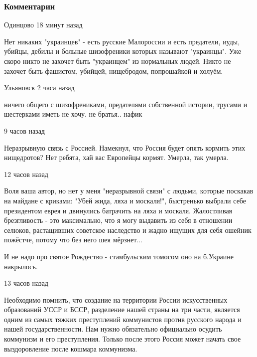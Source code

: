  
 
 
 
 
\subsubsection{Комментарии}
\label{sec:28_12_2020.news.ru.vz.storozhenko_nikolai.1.russia_ukraina_svjaz.comments}

\begin{itemize}

 Одинцово 18 минут назад  

Нет никаких "украинцев" - есть русские Малороссии и есть предатели, иуды,
убийцы, дебилы и больные шизофреники которых называют "украинцы". Уже скоро
никто не захочет быть "украинцем" из нормальных людей. Никто не захочет быть
фашистом, убийцей, нищебродом, попрошайкой и холуём.

 Ульяновск 2 часа назад  

ничего общего с шизофрениками, предателями собственной истории, трусами и
шестерками иметь не хочу. не братья.. нафик

 9 часов назад  

Неразрывную связь с Россией. Намекнул, что Россия будет опять кормить этих
нищедротов? Нет ребята, хай вас Европейцы кормят. Умерла, так умерла.

 12 часов назад  

Воля ваша автор, но нет у меня "неразрывной связи" с людьми, которые поскакав
на майдане с криками: "Убей жида, ляха и москаля!", быстренько выбрали себе
президентом еврея и двинулись батрачить на ляха и москаля. Жалостливая
брезгливость - это максимально, что я могу выдавить из себя в отношении
селюков, растащивших советское наследство и жадно ищущих для себя ошейник
пожёстче, потому что без него шея мёрзнет...

И не надо про святое Рождество - стамбульским томосом оно на б.Украине
накрылось.

 13 часов назад  

Необходимо помнить, что создание на территории России искусственных образований
УССР и БССР, разделение нашей страны на три части, является
одним из самых тяжких преступлений коммунистов против русского
народа и нашей государственности. Нам нужно обязательно
официально осудить коммунизм и его преступления. Только после
этого Россия может начать свое выздоровление после кошмара
коммунизма.


\end{itemize}
